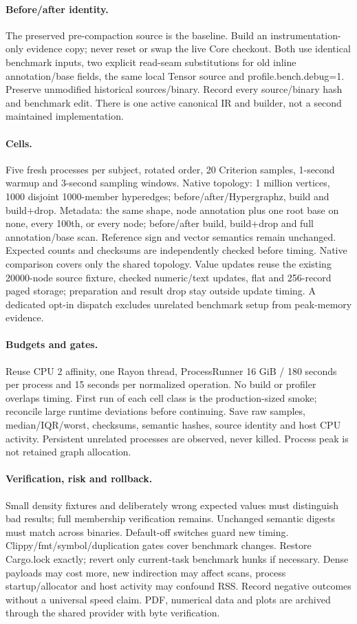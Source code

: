 \documentclass[11pt,a4paper]{article}
\begin{document}
\paragraph{Before/after identity.} The preserved pre-compaction source is the baseline.
Build an instrumentation-only evidence copy; never reset or swap the live Core checkout.
Both use identical benchmark inputs, two explicit read-seam substitutions for old inline
annotation/base fields, the same local Tensor source and profile.bench.debug=1. Preserve
unmodified historical sources/binary. Record every source/binary hash and benchmark edit.
There is one active canonical IR and builder, not a second maintained implementation.
\paragraph{Cells.} Five fresh processes per subject, rotated order, 20 Criterion samples,
1-second warmup and 3-second sampling windows. Native topology: 1 million vertices,
1000 disjoint 1000-member hyperedges; before/after/Hypergraphz, build and build+drop.
Metadata: the same shape, node annotation plus one root base on none, every 100th,
or every node; before/after build, build+drop and full annotation/base scan.
Reference sign and vector semantics remain unchanged. Expected counts and checksums
are independently checked before timing. Native comparison covers only the shared topology.
Value updates reuse the existing 20000-node source fixture, checked numeric/text updates,
flat and 256-record paged storage; preparation and result drop stay outside update timing.
A dedicated opt-in dispatch excludes unrelated benchmark setup from peak-memory evidence.
\paragraph{Budgets and gates.} Reuse CPU 2 affinity, one Rayon thread, ProcessRunner
16 GiB / 180 seconds per process and 15 seconds per normalized operation. No build or
profiler overlaps timing. First run of each cell class is the production-sized smoke;
reconcile large runtime deviations before continuing. Save raw samples, median/IQR/worst,
checksums, semantic hashes, source identity and host CPU activity. Persistent unrelated
processes are observed, never killed. Process peak is not retained graph allocation.
\paragraph{Verification, risk and rollback.} Small density fixtures and deliberately wrong
expected values must distinguish bad results; full membership verification remains.
Unchanged semantic digests must match across binaries. Default-off switches guard new timing.
Clippy/fmt/symbol/duplication gates cover benchmark changes. Restore Cargo.lock exactly;
revert only current-task benchmark hunks if necessary. Dense payloads may cost more,
new indirection may affect scans, process startup/allocator and host activity may confound RSS.
Record negative outcomes without a universal speed claim. PDF, numerical data and plots
are archived through the shared provider with byte verification.
\end{document}
